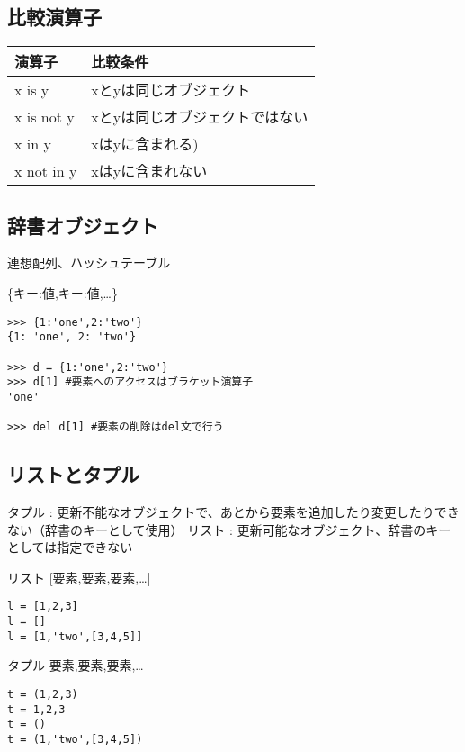 \documentclass[a4j,here,10pt,oneside,openany]{jsbook}
\begin{document}
\subsection{比較演算子}\label{ux6bd4ux8f03ux6f14ux7b97ux5b50}

\begin{table}[htb]
  \begin{tabular}{|l|l|}
  \hline
  \rowcolor[rgb]{0.85,1.0,1.0}演算子 & 比較条件\\
  \hline
  x is y & xとyは同じオブジェクト\\
  \hline
  x is not y & xとyは同じオブジェクトではない\\
  \hline
  x in y & xはyに含まれる)\\
  \hline
  x not in y & xはyに含まれない\\
  \hline
  \end{tabular}
\end{table}

\subsection{辞書オブジェクト}
連想配列、ハッシュテーブル

\{キー:値,キー:値,\ldots{}\}
\begin{framed}
\begin{verbatim}
>>> {1:'one',2:'two'}
{1: 'one', 2: 'two'}

>>> d = {1:'one',2:'two'}
>>> d[1] #要素へのアクセスはブラケット演算子
'one'

>>> del d[1] #要素の削除はdel文で行う
\end{verbatim}
\end{framed}
\subsection{リストとタプル}

タプル :
更新不能なオブジェクトで、あとから要素を追加したり変更したりできない（辞書のキーとして使用）
リスト : 更新可能なオブジェクト、辞書のキーとしては指定できない

リスト {[}要素,要素,要素,\ldots{}{]}
\begin{framed}
\begin{verbatim}
l = [1,2,3]
l = []
l = [1,'two',[3,4,5]]
\end{verbatim}
\end{framed}
タプル 要素,要素,要素,\ldots{}
\begin{framed}
\begin{verbatim}
t = (1,2,3)
t = 1,2,3
t = ()
t = (1,'two',[3,4,5])
\end{verbatim}
\end{framed}
\end{document}
